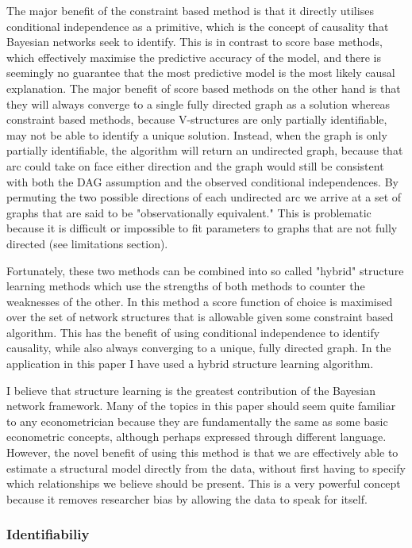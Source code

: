 \documentclass{article}
\begin{document}
The major benefit of the constraint based method is that it directly utilises conditional independence as a primitive, which is the concept of causality that Bayesian networks seek to identify. This is in contrast to score base methods, which effectively maximise the predictive accuracy of the model, and there is seemingly no guarantee that the most predictive model is the most likely causal explanation. The major benefit of score based methods on the other hand is that they will always converge to a single fully directed graph as a solution whereas constraint based methods, because V-structures are only partially identifiable, may not be able to identify a unique solution. Instead, when the graph is only partially identifiable, the algorithm will return an undirected graph, because that arc could take on face either direction and the graph would still be consistent with both the DAG assumption and the observed conditional independences. By permuting the two possible directions of each undirected arc we arrive at a set of graphs that are said to be "observationally equivalent." This is problematic because it is difficult or impossible to fit parameters to graphs that are not fully directed (see limitations section).  

Fortunately, these two methods can be combined into so called "hybrid" structure learning methods which use the strengths of both methods to counter the weaknesses of the other. In this method a score function of choice is maximised over the set of network structures that is allowable given some constraint based algorithm. This has the benefit of using conditional independence to identify causality, while also always converging to a unique, fully directed graph. In the application in this paper I have used a hybrid structure learning algorithm.

I believe that structure learning is the greatest contribution of the Bayesian network framework. Many of the topics in this paper should seem quite familiar to any econometrician because they are fundamentally the same as some basic econometric concepts, although perhaps expressed through different language. However, the novel benefit of using this method is that we are effectively able to estimate a structural model directly from the data, without first having to specify which relationships we believe should be present. This is a very powerful concept because it removes researcher bias by allowing the data to speak for itself.

\subsubsection{Identifiabiliy}
\end{document}
